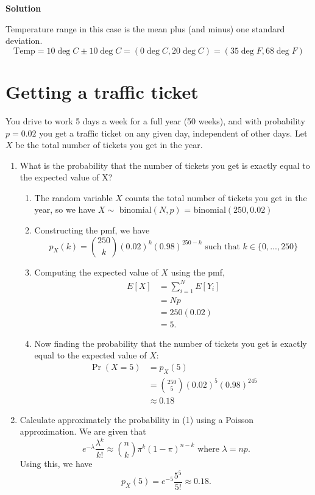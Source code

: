 \documentclass[12pt]{article}
\begin{document}
\textbf{Solution}

Temperature range in this case is the mean plus (and minus) one standard deviation. 
\[ \text{Temp} = 10\deg C \pm 10 \deg C = (0\deg C,20\deg C) = (35 \deg F, 68 \deg F)  \]

\section{Getting a traffic ticket}
You drive to work 5 days a week for a full year (50 weeks), and with probability $p = 0.02$ you get a traffic ticket on any given day, independent of other days. Let $X$ be the total number of tickets you get in the year.

\begin{enumerate}
    \item What is the probability that the number of tickets you get is exactly equal to the expected value of X?

    \begin{enumerate}
        \item The random variable $X$ counts the total number of tickets you get in the year, so we have $X \sim $ binomial$(N,p)$ = binomial$(250,0.02)$
        \item Constructing the pmf, we have 
        \[ p_X(k) = \binom{250}{k}(0.02)^k(0.98)^{250-k} \text{ such that } k \in \{0,...,250\}\]
        \item Computing the expected value of $X$ using the pmf,
        \begin{align*}
            E[X] &= \sum_{i=1}^N E[Y_i] 
            \\ &= Np
            \\ &= 250(0.02)
            \\ &= 5.
        \end{align*}
        \item Now finding the probability that the number of tickets you get is exactly equal to the expected value of $X$:
        \begin{align*}
             \Pr(X=5) &= p_X(5) 
             \\ &= \binom{250}{5}(0.02)^5(0.98)^{245} 
             \\ &\approx 0.18
        \end{align*}
    \end{enumerate}
    
    \item Calculate approximately the probability in (1) using a Poisson approximation.
    We are given that
    \[ e^{-\lambda} \frac{\lambda^k}{k!} \approx \binom{n}{k}\pi^k(1-\pi)^{n-k} \text{ where 
 } \lambda = np.\]
    Using this, we have 
    \[ p_X(5) = e^{-5} \frac{5^5}{5!}\approx 0.18. \]
\end{enumerate}
\end{document}
